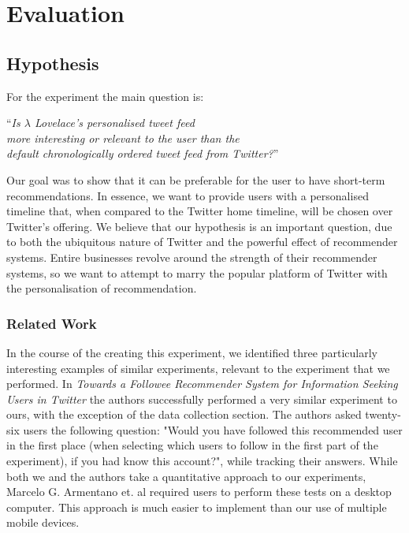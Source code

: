 \documentclass{article}
\begin{document}
\section{Evaluation} %

\subsection{Hypothesis}
For the experiment the main question is: %

\begin{center}
    ``\textit{Is $\lambda$ Lovelace's personalised tweet feed \\
    more interesting or relevant to the user than the \\
    default chronologically ordered tweet feed from Twitter?}''
\end{center}

Our goal was to show that it can be preferable for the user to have short-term recommendations. In essence, we want to provide users with a personalised timeline that, when compared to the Twitter home timeline, will be chosen over Twitter's offering. We believe that our hypothesis is an important question, due to both the ubiquitous nature of Twitter and the powerful effect of recommender systems. Entire businesses revolve around the strength of their recommender systems, so we want to attempt to marry the popular platform of Twitter with the personalisation of recommendation.

\subsubsection*{Related Work} %
In the course of the creating this experiment, we identified three particularly interesting examples of similar experiments, relevant to the experiment that we performed. In \textit{Towards a Followee Recommender System for Information Seeking Users in Twitter} \cite{paper1} the authors successfully performed a very similar experiment to ours, with the exception of the data collection section. The authors asked twenty-six users the following question: "Would you have followed this recommended user in the first place (when selecting which users to follow in the first part of the experiment), if you had know this account?", while tracking their answers. While both we and the authors take a quantitative approach to our experiments, Marcelo G. Armentano et. al required users to perform these tests on a desktop computer. This approach is much easier to implement than our use of multiple mobile devices. 
\end{document}
